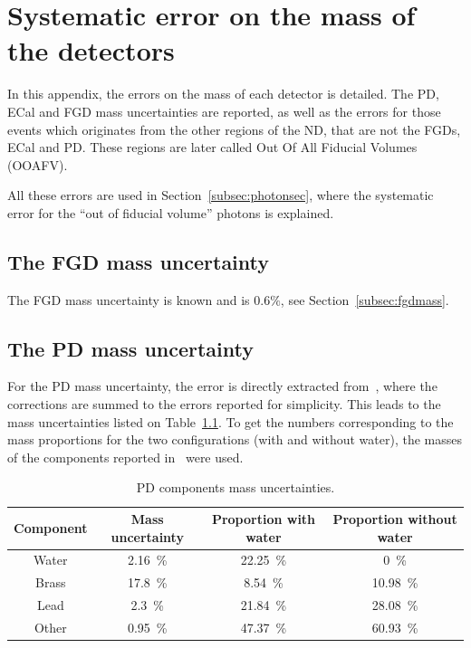 \chapter{Systematic error on the mass of the detectors}
\label{app:mass}
In this appendix, the errors on the mass of each detector is
detailed. The \Gls{PD}, \Gls{ECal} and \Gls{FGD} mass uncertainties
are reported, as well as the errors for those events which originates
from the other regions of the \Gls{ND}, that are not the \Glspl{FGD},
\Gls{ECal} and \Gls{PD}. These regions are later called Out Of All
Fiducial Volumes (\Gls{OOAFV}).

All these errors are used in Section~\ref{subsec:photonsec}, where the
systematic error for the ``out of fiducial volume'' photons is
explained.

\section*{The \Gls{FGD} mass uncertainty}
The \Gls{FGD} mass uncertainty is known and is
$0.6\%$, see Section~\ref{subsec:fgdmass}.

\section*{The \Gls{PD} mass uncertainty}
\label{par:podmassuncertainty}
For the \Gls{PD} mass uncertainty, the error is directly extracted
from~\cite{TN258}, where the corrections are summed to the errors
reported for simplicity. This leads to the mass uncertainties listed
on Table~\ref{tab:podmass}. To get the numbers corresponding to the
mass proportions for the two configurations (with and without water),
the masses of the components reported in~\cite{P0Dpaper2012} were
used.

\begin{table}[ht]
  \center
  \begin{tabular}{cccc}
    \toprule
    Component & Mass uncertainty    & Proportion with water & Proportion without water \\ 
    \midrule
    Water     & 2.16~\%      & 22.25~\% & 0~\% \\
    Brass     & 17.8~\%      & 8.54~\%  & 10.98~\% \\
    Lead      & 2.3~\%       & 21.84~\% & 28.08~\% \\
    Other     & 0.95~\%      & 47.37~\% & 60.93~\% \\
    \bottomrule
  \end{tabular}
  \caption[P0D components mass uncertainties]{\Gls{PD} components mass
    uncertainties.}
  \label{tab:podmass}
\end{table}

